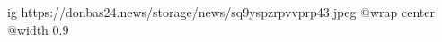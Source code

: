  
 
 
 
 

\ifcmt
  ig https://donbas24.news/storage/news/sq9yspzrpvvprp43.jpeg
  @wrap center
  @width 0.9
\fi
